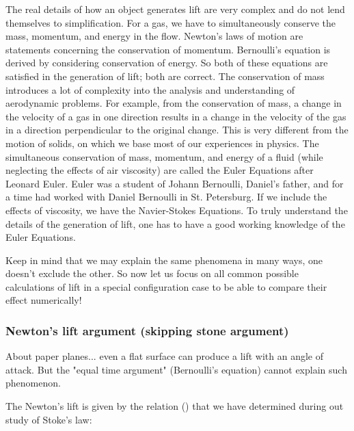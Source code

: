 	The real details of how an object generates lift are very complex and do not lend themselves to simplification. For a gas, we have to simultaneously conserve the mass, momentum, and energy in the flow. Newton's laws of motion are statements concerning the conservation of momentum. Bernoulli's equation is derived by considering conservation of energy. So both of these equations are satisfied in the generation of lift; both are correct. The conservation of mass introduces a lot of complexity into the analysis and understanding of aerodynamic problems. For example, from the conservation of mass, a change in the velocity of a gas in one direction results in a change in the velocity of the gas in a direction perpendicular to the original change. This is very different from the motion of solids, on which we base most of our experiences in physics. The simultaneous conservation of mass, momentum, and energy of a fluid (while neglecting the effects of air viscosity) are called the Euler Equations after Leonard Euler. Euler was a student of Johann Bernoulli, Daniel's father, and for a time had worked with Daniel Bernoulli in St. Petersburg. If we include the effects of viscosity, we have the Navier-Stokes Equations. To truly understand the details of the generation of lift, one has to have a good working knowledge of the Euler Equations.
	
	Keep in mind that we may explain the same phenomena in many ways, one doesn't exclude the other. So now let us focus on all common possible calculations of lift in a special configuration case to be able to compare their effect numerically!
	
	\subsubsection{Newton's lift argument (skipping stone argument)}
	About paper planes... even a flat surface can produce a lift with an angle of attack. But the "equal time argument" (Bernoulli's equation) cannot explain such phenomenon.
	
	The Newton's lift is given by the relation () that we have determined during out study of Stoke's law:
	
